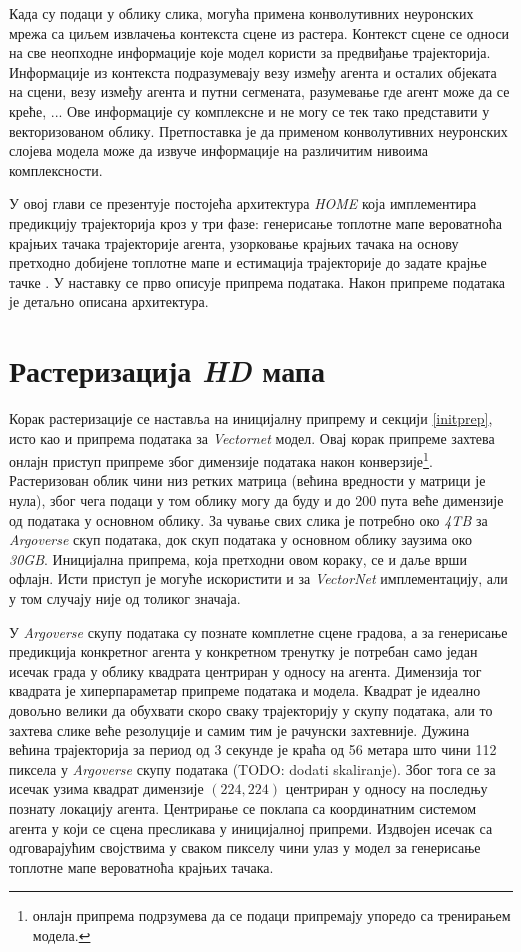 \documentclass[11pt,oneside]{memoir}
\begin{document}
Када су подаци у облику слика, могућа примена конволутивних неуронских мрежа са циљем извлачења контекста сцене из растера. 
Контекст сцене се односи на све неопходне информације које модел користи за предвиђање трајекторија. Информације из контекста подразумевају
везу између агента и осталих објеката на сцени, везу између агента и путни сегмената, разумевање где агент може да се креће, ... Ове
информације су комплексне и не могу се тек тако представити у векторизованом облику. Претпоставка је да применом конволутивних неуронских
слојева модела може да извуче информације на различитим нивоима комплексности. 

У овој глави се презентује постојећа архитектура \textit{HOME} која имплементира предикцију трајекторија кроз у три фазе: 
генерисање топлотне мапе вероватноћа крајњих тачака трајекторије агента, 
узорковање крајњих тачака на основу претходно добијене топлотне мапе и естимација трајекторије до задате крајње
тачке \cite{home}. У наставку се прво описује припрема података. Након припреме података је детаљно описана архитектура.

\section{Растеризација \textit{HD} мапа}

Корак растеризације се наставља на иницијалну припрему и секцији \ref{initprep}, исто као и припрема података за \textit{Vectornet} модел. 
Овај корак припреме захтева онлајн приступ припреме због димензије података након 
конверзије\footnote{онлајн припрема подрзумева да се подаци припремају упоредо са тренирањем модела.}. Растеризован облик чини
низ ретких матрица (већина вредности у матрици је нула), због чега подаци у том облику могу да буду 
и до 200 пута веће димензије од података у основном облику. За чување 
свих слика је потребно око \textit{4TB} за \textit{Argoverse} скуп података, 
док скуп података у основном облику заузима око \textit{30GB}. Иницијална
припрема, која претходни овом кораку, се и даље врши офлајн. 
Исти приступ је могуће искористити и за \textit{VectorNet} имплементацију, али у том случају није од толиког значаја. 

У \textit{Argoverse} скупу података су познате комплетне сцене градова, а за генерисање предикција конкретног агента у конкретном тренутку је
потребан само један исечак града у облику квадрата центриран у односу на агента. 
Димензија тог квадрата је хиперпараметар припреме података и модела. Квадрат је идеално довољно велики да обухвати скоро сваку
трајекторију у скупу података, али то захтева слике веће резолуције и самим тим је рачунски захтевније. 
Дужина већина трајекторија за период од 3 секунде је краћа од 56 метара што чини 112 
пиксела у \textit{Argoverse} скупу података (TODO: dodati skaliranje). Због
тога се за исечак узима квадрат димензије $(224, 224)$ центриран у односу на последњу познату локацију агента. Центрирање се поклапа
са координатним системом агента у који се сцена пресликава у иницијалној припреми. Издвојен исечак са
одговарајућим својствима у сваком пикселу чини улаз у модел за генерисање топлотне мапе вероватноћа крајњих тачака. 
\end{document}
